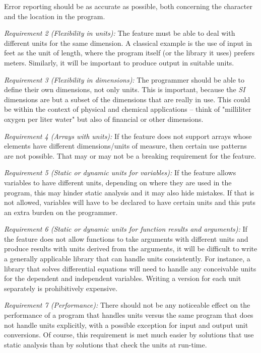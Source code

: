 \documentclass{article}
\begin{document}
Error reporting should be as accurate as possible, both concerning the character and the location in the program.

\vspace{\baselineskip}
\noindent \emph{Requirement 2 (Flexibility in units):}
The feature must be able to deal with different units for the same dimension. A classical example is the use of
input in feet as the unit of length, where the program itself (or the library it uses) prefers meters. Similarly,
it will be important to produce output in suitable units.

\vspace{\baselineskip}
\noindent \emph{Requirement 3 (Flexibility in dimensions):}
The programmer should be able to define their own dimensions, not only units. This is important, because the \emph{SI}
dimensions are but a subset of the dimensions that are really in use. This could be within the context of
physical and chemical applications -- think of "milliliter oxygen per liter water" but also of financial or other dimensions.

\vspace{\baselineskip}
\noindent \emph{Requirement 4 (Arrays with units):}
If the feature does not support arrays whose elements have different dimensions/units of measure, then
certain use patterns are not possible. That may or may not be a breaking requirement for the feature.

\vspace{\baselineskip}
\noindent \emph{Requirement 5 (Static or dynamic units for variables):}
If the feature allows variables to have different units, depending on where they are used in the program, this
may hinder static analysis and it may also hide mistakes. If that is not allowed, variables will have to be
declared to have certain units and this puts an extra burden on the programmer.

\vspace{\baselineskip}
\noindent \emph{Requirement 6 (Static or dynamic units for function results and arguments):}
If the feature does not allow functions to take arguments with different units and produce results with units derived
from the arguments, it will be difficult to write a generally applicable library that can handle units consistently.
For instance, a library that solves differential equations will need to handle any conceivable units for the
dependent and independent variables. Writing a version for each unit separately is prohibitively expensive.

\vspace{\baselineskip}
\noindent \emph{Requirement 7 (Performance):}
There should not be any noticeable effect on the performance of a program that handles units versus the same program
that does not handle units explicitly, with a possible exception for input and output unit conversions. Of course, this
requirement is met much easier by solutions that use static analysis than by solutions that check the units at run-time.
\end{document}

